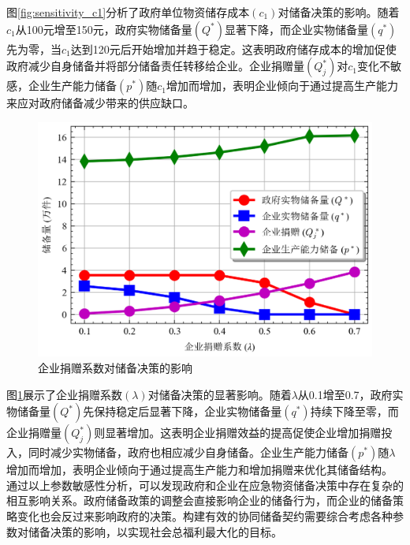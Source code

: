 \documentclass[a4paper,8pt,twocolumn]{article} %
\begin{document}
图\ref{fig:sensitivity_c1}分析了政府单位物资储存成本$(c_1)$对储备决策的影响。随着$c_1$从100元增至150元，政府实物储备量$(Q^*)$显著下降，而企业实物储备量$(q^*)$先为零，当$c_1$达到120元后开始增加并趋于稳定。这表明政府储存成本的增加促使政府减少自身储备并将部分储备责任转移给企业。企业捐赠量$(Q_j^*)$对$c_1$变化不敏感，企业生产能力储备$(p^*)$随$c_1$增加而增加，表明企业倾向于通过提高生产能力来应对政府储备减少带来的供应缺口。
\begin{figure}[H]
\centering
\includegraphics[width=\linewidth]{basic_pictures/sensitivity_lam.png}
\caption{企业捐赠系数对储备决策的影响}
\label{fig:sensitivity_lam}
\end{figure}
图\ref{fig:sensitivity_lam}展示了企业捐赠系数$(\lambda)$对储备决策的显著影响。随着$\lambda$从0.1增至0.7，政府实物储备量$(Q^*)$先保持稳定后显著下降，企业实物储备量$(q^*)$持续下降至零，而企业捐赠量$(Q_j^*)$则显著增加。这表明企业捐赠效益的提高促使企业增加捐赠投入，同时减少实物储备，政府也相应减少自身储备。企业生产能力储备$(p^*)$随$\lambda$增加而增加，表明企业倾向于通过提高生产能力和增加捐赠来优化其储备结构。
通过以上参数敏感性分析，可以发现政府和企业在应急物资储备决策中存在复杂的相互影响关系。政府储备政策的调整会直接影响企业的储备行为，而企业的储备策略变化也会反过来影响政府的决策。构建有效的协同储备契约需要综合考虑各种参数对储备决策的影响，以实现社会总福利最大化的目标。


\begin{table}[H]
\centering
\caption{SLSQP算法求解结果与文献精确解对比 (单位：万件)}
\label{tab:slsqp_vs_exact}
\small
{}
\end{table}
\end{document}
